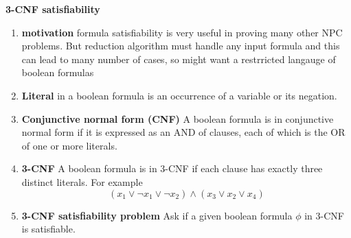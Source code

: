 \documentclass[11pt]{article}
\begin{document}
\begin{defn*}
    \textbf{3-CNF satisfiability} 
    \begin{enumerate}
        \item \textbf{motivation} formula satisfiability is very useful in proving many other NPC problems. But reduction algorithm must handle any input formula and this can lead to many number of cases, so might want a restrricted langauge of boolean formulas
        \item \textbf{Literal} in a boolean formula is an occurrence of a variable or its negation. 
        \item \textbf{Conjunctive normal form (CNF)} A boolean formula is in conjunctive normal form if it is expressed as an AND of clauses, each of which is the OR of one or more literals. 
        \item \textbf{3-CNF} A boolean formula is in 3-CNF if each clause has exactly three distinct literals. For example
        \[
            (x_1 \lor \neg x_1 \lor \neg x_2) \land (x_3 \lor x_2 \lor x_4)
        \]
        \item \textbf{3-CNF satisfiability problem} Ask if a given boolean formula $\phi$ in 3-CNF is satisfiable. 
    \end{enumerate}
\end{defn*}
\end{document}
